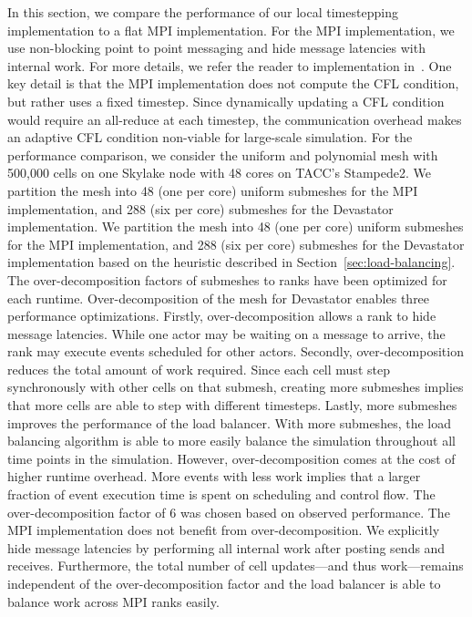 In this section, we compare the performance of our local timestepping implementation to a flat MPI implementation. For the MPI implementation, we use non-blocking point to point messaging and hide message latencies with internal work. For more details, we refer the reader to implementation in~\cite{Bremer2019}. One key detail is that the MPI implementation does not compute the CFL condition, but rather uses a fixed timestep. Since dynamically updating a CFL condition would require an all-reduce at each timestep, the communication overhead makes an adaptive CFL condition non-viable for large-scale simulation.
For the performance comparison, we consider the uniform and polynomial mesh with 500,000 cells on one Skylake node with 48 cores on TACC's Stampede2. We partition the mesh into 48 (one per core) uniform submeshes for the MPI implementation, and 288 (six per core) submeshes for the Devastator implementation.
We partition the mesh into 48 (one per core) uniform submeshes for the MPI implementation, and 288 (six per core) submeshes for the Devastator implementation based on the heuristic described in Section~\ref{sec:load-balancing}. %
The over-decomposition factors of submeshes to ranks have been optimized for each runtime.
Over-decomposition of the mesh for Devastator enables three performance optimizations.
Firstly, over-decomposition allows a rank to hide message latencies. While one actor may be waiting on a message to arrive, the rank may execute events scheduled for other actors. 
Secondly, over-decomposition reduces the total amount of work required. Since each cell must step synchronously with other cells on that submesh, creating more submeshes implies that more cells are able to step with different timesteps. 
Lastly, more submeshes improves the performance of the load balancer. With more submeshes, the load balancing algorithm is able to more easily balance the simulation throughout all time points in the simulation. However, over-decomposition  comes at the cost of higher runtime overhead. More events with less work implies that a larger fraction of event execution time is spent on scheduling and control flow. The over-decomposition factor of 6 was chosen based on observed performance.
The MPI implementation does not benefit from over-decomposition. We explicitly hide message latencies by performing all internal work after posting sends and receives. Furthermore, the total number of cell updates---and thus work---remains independent of the over-decomposition factor and the load balancer is able to balance work across MPI ranks easily. 

